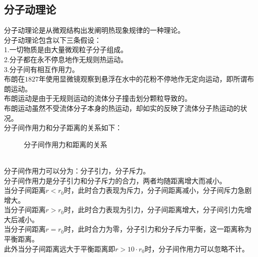 \documentclass[UTF8]{ctexart}
\begin{document}
\subsection{分子动理论}
    分子动理论是从微观结构出发阐明热现象规律的一种理论。\\[3mm]
    分子动理论包含以下三条假设：\\[3mm]
    1.一切物质是由大量微观粒子分子组成。\\[3mm]
    2.分子都在永不停息地作无规则热运动。\\[3mm]
    3.分子间有相互作用力。\\[6mm]
    布朗在$1827$年使用显微镜观察到悬浮在水中的花粉不停地作无定向运动，即所谓布朗运动。\\[3mm]
    布朗运动是由于无规则运动的流体分子撞击划分颗粒导致的。\\[3mm]
    布朗运动虽然不受流体分子本身的热运动，却如实的反映了流体分子热运动的状况。\\[6mm]
    分子间作用力和分子距离的关系如下：\vspace{5pt}
    \begin{figure}[h]
        \begin{center}
            \qquad
            \caption{分子间作用力和距离的关系}
        \end{center}
    \end{figure}\\
    分子间作用力可以分为：分子引力，分子斥力。\\[3mm]
    分子间作用力是分子引力和分子斥力的合力，两者均随距离增大而减小。\\[3mm]
    当分子间距离$r<r_0$时，此时合力表现为斥力，分子间距离减小，分子间斥力急剧增大。\\[3mm]
    当分子间距离$r>r_0$时，此时合力表现为引力，分子间距离增大，分子间引力先增大后减小。\\[3mm]
    当分子间距离$r=r_0$时，此时合力为零，分子引力和分子斥力平衡，这一距离称为平衡距离。\\[3mm]
    此外当分子间距离远大于平衡距离即$r>10\cdot r_0$时，分子间作用力可以忽略不计。
\end{document}
